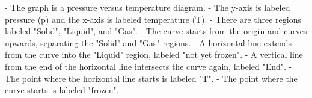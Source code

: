- The graph is a pressure versus temperature diagram.
- The y-axis is labeled pressure (p) and the x-axis is labeled temperature (T).
- There are three regions labeled "Solid", "Liquid", and "Gas".
- The curve starts from the origin and curves upwards, separating the "Solid" and "Gas" regions.
- A horizontal line extends from the curve into the "Liquid" region, labeled "not yet frozen".
- A vertical line from the end of the horizontal line intersects the curve again, labeled "End".
- The point where the horizontal line starts is labeled "T".
- The point where the curve starts is labeled "frozen".